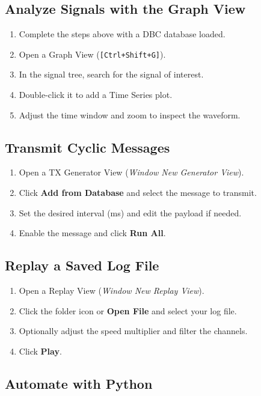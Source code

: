 \documentclass[a4paper,11pt]{article}
\newcommand{\key}[1]{\texttt{\small[#1]}}
\newcommand{\menu}[1]{\textit{#1}}
\newcommand{\ui}[1]{\textbf{#1}}
\begin{document}
\subsection{Analyze Signals with the Graph View}

\begin{enumerate}
  \item Complete the steps above with a DBC database loaded.
  \item Open a Graph View (\key{Ctrl+Shift+G}).
  \item In the signal tree, search for the signal of interest.
  \item Double-click it to add a Time Series plot.
  \item Adjust the time window and zoom to inspect the waveform.
\end{enumerate}

\subsection{Transmit Cyclic Messages}

\begin{enumerate}
  \item Open a TX Generator View (\menu{Window \textrightarrow{} New \textrightarrow{} Generator View}).
  \item Click \ui{Add from Database} and select the message to transmit.
  \item Set the desired interval (ms) and edit the payload if needed.
  \item Enable the message and click \ui{Run All}.
\end{enumerate}

\subsection{Replay a Saved Log File}

\begin{enumerate}
  \item Open a Replay View (\menu{Window \textrightarrow{} New \textrightarrow{} Replay View}).
  \item Click the folder icon or \ui{Open File} and select your log file.
  \item Optionally adjust the speed multiplier and filter the channels.
  \item Click \ui{Play}.
\end{enumerate}

\subsection{Automate with Python}
\end{document}
